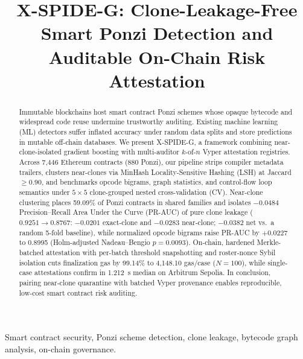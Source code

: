 \documentclass[conference]{IEEEtran}
\newif\ifanonymous
\begin{document}

\title{X-SPIDE-G: Clone-Leakage-Free Smart Ponzi Detection and Auditable On-Chain Risk Attestation}

\ifanonymous
\author{\IEEEauthorblockN{Anonymous Author(s)}\IEEEauthorblockA{Double-Blind Review Copy}}
\else
\author{
}
\fi

\maketitle

\begin{abstract}
Immutable blockchains host smart contract Ponzi schemes whose opaque bytecode and widespread code reuse undermine trustworthy auditing. Existing machine learning (ML) detectors suffer inflated accuracy under random data splits and store predictions in mutable off-chain databases. We present X-SPIDE-G, a framework combining near-clone-isolated gradient boosting with multi-auditor $k$-of-$n$ Vyper attestation registries. Across 7,446 Ethereum contracts (880 Ponzi), our pipeline strips compiler metadata trailers, clusters near-clones via MinHash Locality-Sensitive Hashing (LSH) at Jaccard $\ge 0.90$, and benchmarks opcode bigrams, graph statistics, and control-flow loop semantics under $5\times 5$ clone-grouped nested cross-validation (CV). Near-clone clustering places 59.09\% of Ponzi contracts in shared families and isolates $-0.0484$ Precision--Recall Area Under the Curve (PR-AUC) of pure clone leakage ($0.9251 \to 0.8767$: $-0.0201$ exact-clone and $-0.0283$ near-clone; $-0.0382$ net vs.\ a random 5-fold baseline), while normalized opcode bigrams raise PR-AUC by $+0.0227$ to 0.8995 (Holm-adjusted Nadeau--Bengio $p=0.0093$). On-chain, hardened Merkle-batched attestation with per-batch threshold snapshotting and roster-nonce Sybil isolation cuts finalization gas by 99.14\% to 4,148.10 gas/case ($N=100$), while single-case attestations confirm in 1.212~s median on Arbitrum Sepolia. In conclusion, pairing near-clone quarantine with batched Vyper provenance enables reproducible, low-cost smart contract risk auditing.
\end{abstract}

\begin{IEEEkeywords}
Smart contract security, Ponzi scheme detection, clone leakage, bytecode graph analysis, on-chain governance.
\end{IEEEkeywords}
\end{document}

